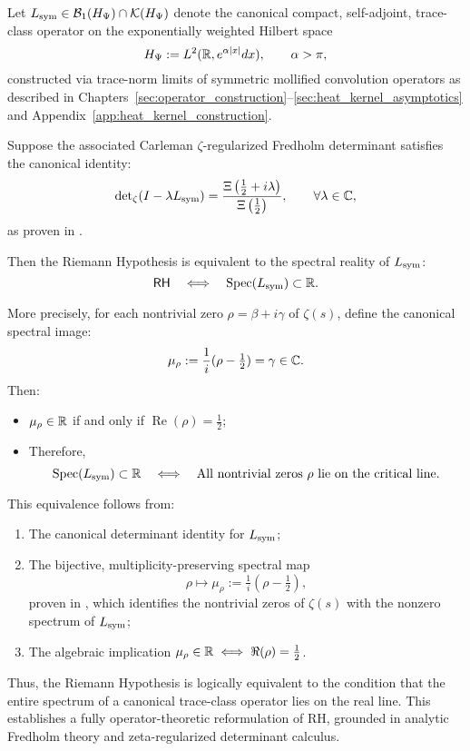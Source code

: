 \begin{theorem}
\label{thm:eq_of_rh}
Let \( L_{\mathrm{sym}} \in \mathcal{B}_1(H_{\Psi}) \cap \mathcal{K}(H_{\Psi}) \) denote the canonical compact, self-adjoint, trace-class operator on the exponentially weighted Hilbert space
\[
H_{\Psi} := L^2(\mathbb{R}, e^{\alpha |x|} dx), \qquad \alpha > \pi,
\]
constructed via trace-norm limits of symmetric mollified convolution operators as described in Chapters~\ref{sec:operator_construction}–\ref{sec:heat_kernel_asymptotics} and Appendix~\ref{app:heat_kernel_construction}.

\medskip

Suppose the associated Carleman \(\zeta\)-regularized Fredholm determinant satisfies the canonical identity:
\[
\det\nolimits_{\zeta}(I - \lambda L_{\mathrm{sym}}) = \frac{\Xi\left( \tfrac{1}{2} + i\lambda \right)}{\Xi\left( \tfrac{1}{2} \right)},
\qquad \forall \lambda \in \mathbb{C},
\]
as proven in .

\medskip

Then the Riemann Hypothesis is equivalent to the spectral reality of \( L_{\mathrm{sym}} \):
\[
\mathsf{RH} \quad \Longleftrightarrow \quad \operatorname{Spec}(L_{\mathrm{sym}}) \subset \mathbb{R}.
\]

\medskip

\noindent
More precisely, for each nontrivial zero \( \rho = \beta + i\gamma \) of \( \zeta(s) \), define the canonical spectral image:
\[
\mu_\rho := \frac{1}{i}(\rho - \tfrac{1}{2}) = \gamma \in \mathbb{C}.
\]
Then:
\begin{itemize}
  \item \( \mu_\rho \in \mathbb{R} \) if and only if \( \operatorname{Re}(\rho) = \tfrac{1}{2} \);
  \item Therefore,
  \[
  \operatorname{Spec}(L_{\mathrm{sym}}) \subset \mathbb{R}
  \quad \Longleftrightarrow \quad
  \text{All nontrivial zeros } \rho \text{ lie on the critical line}.
  \]
\end{itemize}

\medskip

\noindent
This equivalence follows from:
\begin{enumerate}
  \item The canonical determinant identity for \( L_{\mathrm{sym}} \);
  \item The bijective, multiplicity-preserving spectral map
  \[
  \rho \longmapsto \mu_\rho := \tfrac{1}{i}(\rho - \tfrac{1}{2}),
  \]
  proven in , which identifies the nontrivial zeros of \( \zeta(s) \) with the nonzero spectrum of \( L_{\mathrm{sym}} \);
  \item The algebraic implication \( \mu_\rho \in \mathbb{R} \iff \Re(\rho) = \tfrac{1}{2} \).
\end{enumerate}

\medskip

\noindent
Thus, the Riemann Hypothesis is logically equivalent to the condition that the entire spectrum of a canonical trace-class operator lies on the real line. This establishes a fully operator-theoretic reformulation of RH, grounded in analytic Fredholm theory and zeta-regularized determinant calculus.
\end{theorem}
